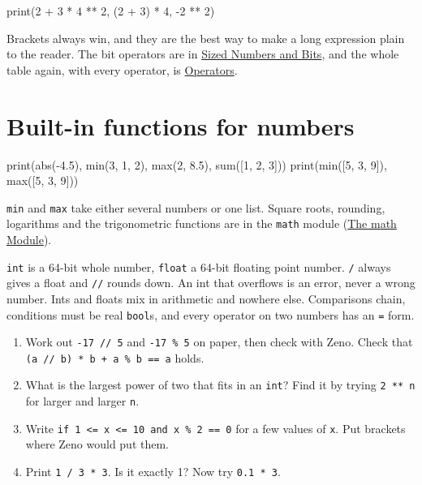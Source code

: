 \begin{zeno}
print(2 + 3 * 4 ** 2, (2 + 3) * 4, -2 ** 2)
\end{zeno}

Brackets always win, and they are the best way to make a long
expression plain to the reader. The bit operators are in
\hyperref[ch-sized-numbers]{Sized Numbers and Bits}, and the whole
table again, with every operator, is \hyperref[app-operators]{Operators}.

\section{Built-in functions for numbers}

\begin{zeno}
print(abs(-4.5), min(3, 1, 2), max(2, 8.5), sum([1, 2, 3]))
print(min([5, 3, 9]), max([5, 3, 9]))
\end{zeno}

\verb|min| and \verb|max| take either several numbers or one list.
Square roots, rounding, logarithms and the trigonometric functions are
in the \verb|math| module (\hyperref[ch-math]{The math Module}).

\begin{summary}
\verb|int| is a 64-bit whole number, \verb|float| a 64-bit floating
point number. \verb|/| always gives a float and \verb|//| rounds down.
An int that overflows is an error, never a wrong number. Ints and
floats mix in arithmetic and nowhere else. Comparisons chain,
conditions must be real \verb|bool|s, and every operator on two
numbers has an \verb|=| form.
\end{summary}

\begin{tryit}
\begin{enumerate}
\item Work out \verb|-17 // 5| and \verb|-17 % 5| on paper, then check
  with Zeno. Check that \verb|(a // b) * b + a % b == a| holds.
\item What is the largest power of two that fits in an \verb|int|?
  Find it by trying \verb|2 ** n| for larger and larger \verb|n|.
\item Write \verb|if 1 <= x <= 10 and x % 2 == 0| for a few values of
  \verb|x|. Put brackets where Zeno would put them.
\item Print \verb|1 / 3 * 3|. Is it exactly 1? Now try
  \verb|0.1 * 3|.
\end{enumerate}
\end{tryit}
